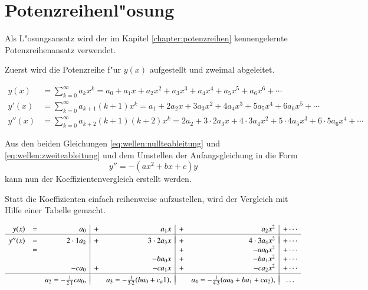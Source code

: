 \section{Potenzreihenl"osung}
Als L"osungsansatz wird der im Kapitel \ref{chapter:potenzreihen} 
kennengelernte Potenzreihenansatz verwendet.

Zuerst wird die Potenzreihe f"ur $y(x)$ aufgestellt und zweimal abgeleitet.

\begin{align}
	y(x)
	&=
	\sum_{k = 0}^{\infty} a_{k}x^k
	=
	a_0 + a_1x + a_2x^2 + a_3x^3 + a_4x^4 + a_5x^5 + a_6x^6 + \dotsb
	\label{eq:wellen:nullteableitung}
	\\
	y'(x)
	&=
	\sum_{k=0}^{\infty} a_{k+1}(k+1)x^k
	=
	a_1 + 2a_2x + 3a_3x^2 + 4a_4x^3 + 5a_5x^4 + 6a_6x^5+ \dotsb
	\label{eq:wellen:ersteableitung}
	\\
	y''(x)
	&=
	\sum_{k = 0}^{\infty} a_{k+2}(k+1)(k+2)x^k
	=
	2a_2 + 3 \mathbin{\cdot} 2a_3x + 4 \mathbin{\cdot} 3a_4x^2 + 5 
	\mathbin{\cdot} 4a_5x^3 + 6 \mathbin{\cdot} 5a_6x^4 + \dotsb
	\label{eq:wellen:zweiteableitung}
\end{align}

Aus den beiden Gleichungen \ref{eq:wellen:nullteableitung} und
\ref{eq:wellen:zweiteableitung} und dem Umstellen der Anfangsgleichung in die 
Form
\begin{equation*}
	y'' = -(ax^2+bx+c)y
\end{equation*}
kann nun der Koeffizientenvergleich erstellt werden. 

Statt die Koeffizienten einfach reihenweise aufzustellen, wird der Vergleich 
mit Hilfe einer Tabelle gemacht.

\begin{equation}
	\begin{array}{r c r | c r | c r | c r c}
	y(x) & = &
	a_0 & + & a_1x & + & a_2x^2 & + \dotsb
	\\
	\hline&&&&&&&\\[-2ex]
	y''(x) & = &
	2\cdot1 a_2 & + & 3\cdot2 a_3x & + & 4\cdot3 a_4x^2 & + \dotsb
	\\
	& = &
	& & & + &- aa_0x^2 & + \dotsb
	\\
	& &
	& &- ba_0x & + &- ba_1x^2 & + \dotsb
	\\
	& &
	-ca_0 & + &- ca_1x & + &- ca_2x^2 & + \dotsb
	\\
	\hline&&&&&&&\\[-2ex]
	& &
	a_2 = -\frac{1}{2 \cdot 1}ca_0,
	& & a_3 = -\frac{1}{3 \cdot 2}(ba_0+c_a1),
	& & a_4 = -\frac{1}{4 \cdot 3}(aa_0+ba_1+ca_2),
	& \dots
	\end{array}
	\label{eq:wellen:koeffizietenvergleichtabelle}
\end{equation}

